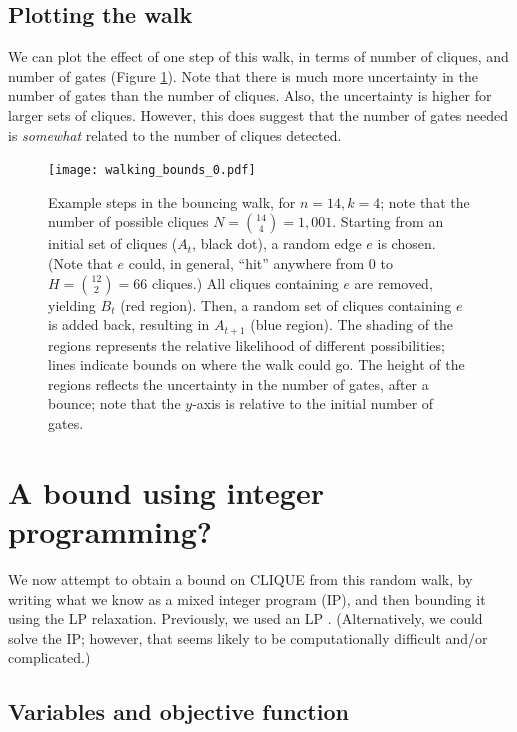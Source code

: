\documentclass[12pt]{article}
\theoremstyle{definition}
\begin{document}
\subsection{Plotting the walk}

We can plot the effect of one step of this walk, in terms of number of cliques, and number of gates (Figure \ref{fig:walk}).
Note that there is much more uncertainty in the number of gates than the number of cliques. Also, the
uncertainty is higher
for larger sets of cliques.  However, this does suggest that the
number of gates needed is {\em somewhat} related to the number of cliques detected.

\begin{figure}

\centering

\texttt{[image: walking\_bounds\_0.pdf]}

\caption{
Example steps in the bouncing walk, for $n=14, k=4$; 
note that the number of possible cliques $N = {14 \choose 4} = 1,001$.
 Starting from an initial set of cliques ($A_t$, black dot),
a random edge $e$ is chosen. (Note that $e$ could, in general,
``hit'' anywhere from 0 to $H = {12 \choose 2} = 66$ cliques.)
 All cliques containing $e$ are removed, yielding $B_t$ (red region).
Then, a random set of cliques containing $e$ is added back, resulting in $A_{t+1}$ (blue region).
The shading of the regions represents the relative likelihood of different possibilities;
lines indicate bounds on where the walk could go.
The height of the regions reflects the uncertainty in the number
of gates, after a bounce; note that the $y$-axis is relative to the initial number of gates.
}
\label{fig:walk}

\end{figure}


\section{A bound using integer programming?}

We now attempt to obtain a bound on CLIQUE from this random walk, by
writing what we know as a mixed integer program (IP), and then bounding it
using the LP relaxation. Previously, we used an LP \cite{buggyclique}.
(Alternatively, we could solve the IP; however, that seems likely to
be computationally difficult and/or complicated.)

\subsection{Variables and objective function}
\end{document}
